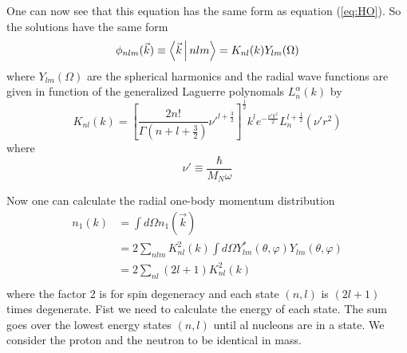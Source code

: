 \documentclass[12pt]{article}
\begin{document}
One can now see that this equation has the same form as equation (\ref{eq:HO}). So the solutions have the same form
\begin{equation}
\phi_{nlm}(\vec{k}) \equiv \Braket{\vec{k}|nlm} = K_{nl}(k)Y_{lm}(\Omega)	
\end{equation}
where $Y_{lm}(\Omega)$ are the spherical harmonics and the radial wave functions are given in function of the generalized Laguerre polynomals $L^\alpha_n(k)$ by
\begin{equation}
 K_{nl}(k) = \left[ \frac{2n!}{\Gamma(n+l+\frac{3}{2})}\nu'^{l+\frac{3}{2}} \right]^{\frac{1}{2}} k^l e^{-\frac{\nu' k^2}{2}} L^{l+\frac{1}{2}}_n(\nu' r^2)
\end{equation}
where 
\begin{equation}
\nu' \equiv \frac{\hbar}{M_N \omega}
\end{equation}

Now one can calculate the radial one-body momentum distribution
\begin{align}
n_1(k) & = \int d\Omega n_1(\vec{k}) \\
	   & = 2 \sum_{nlm} K^2_{nl}(k) \int d\Omega Y^*_{lm}(\theta, \varphi) Y_{lm}(\theta, \varphi)  \\
	   & = 2 \sum_{nl} (2l+1) K^2_{nl}(k)\\
\end{align}
where the factor 2 is for spin degeneracy and each state $(n,l)$ is $(2l+1)$ times degenerate. Fist we need to calculate the energy of each state. The sum goes over the lowest energy states $(n,l)$ until al nucleons are in a state. We consider the proton and the neutron to be identical in mass.
\end{document}

